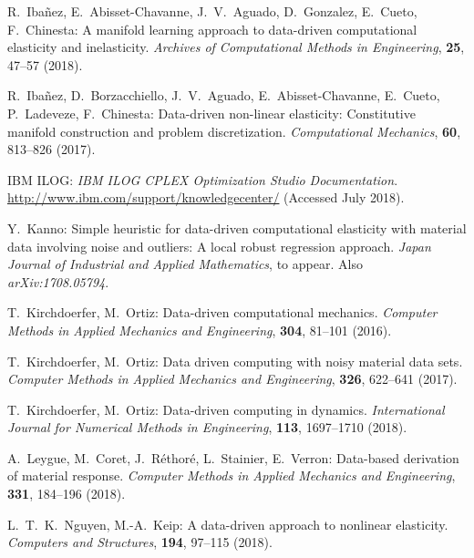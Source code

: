 \documentclass[a4paper,11pt]{scrartcl}
\theoremstyle{plain}
\theoremstyle{definition}
\theoremstyle{remark}
\begin{document}
\begin{thebibliography}{99}
  {R.~Iba\~{n}ez, E.~Abisset-Chavanne, J.~V.~Aguado, D.~Gonzalez, E.~Cueto, F.~Chinesta}:
  {A manifold learning approach to data-driven computational 
    elasticity and inelasticity}.
  {\em Archives of Computational Methods in Engineering},
  \textbf{25}, 47--57 (2018).

  {R.~Iba\~{n}ez, D.~Borzacchiello, J.~V.~Aguado, 
    E.~Abisset-Chavanne, E.~Cueto, P.~Ladeveze, F.~Chinesta}:
  {Data-driven non-linear elasticity: Constitutive manifold 
    construction and problem discretization}.
  {\em Computational Mechanics},
  \textbf{60}, 813--826 (2017).

  {IBM ILOG}:
  {\em IBM ILOG CPLEX Optimization Studio Documentation}.
  \url{http://www.ibm.com/support/knowledgecenter/}
  (Accessed July 2018).

  {Y.~Kanno}:
  {Simple heuristic for data-driven computational elasticity 
    with material data involving noise and outliers: 
    A local robust regression approach}.
  {\em Japan Journal of Industrial and Applied Mathematics},
  to appear. 
  Also {\em arXiv:1708.05794\/}.

  {T.~Kirchdoerfer, M.~Ortiz}:
  {Data-driven computational mechanics}.
  {\em Computer Methods in Applied Mechanics and Engineering},
  \textbf{304}, 81--101 (2016).

  {T.~Kirchdoerfer, M.~Ortiz}:
  {Data driven computing with noisy material data sets}.
  {\em Computer Methods in Applied Mechanics and Engineering},
  \textbf{326}, 622--641 (2017).

  {T.~Kirchdoerfer, M.~Ortiz}:
  {Data-driven computing in dynamics}.
  {\em International Journal for Numerical Methods in Engineering},
  \textbf{113}, 1697--1710 (2018).

  {A.~Leygue, M.~Coret, J.~R\'{e}thor\'{e}, L.~Stainier, E.~Verron}:
  {Data-based derivation of material response}.
  {\em Computer Methods in Applied Mechanics and Engineering},
  \textbf{331}, 184--196 (2018).

  {L.~T.~K.~Nguyen, M.-A.~Keip}:
  {A data-driven approach to nonlinear elasticity}.
  {\em Computers and Structures},
  \textbf{194}, 97--115 (2018).

\end{thebibliography}
\end{document}
